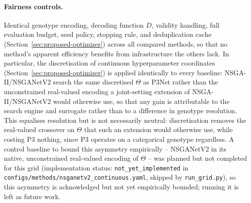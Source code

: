 \paragraph{Fairness controls.} Identical genotype encoding, decoding function $D$, validity handling,
full evaluation budget, seed policy, stopping rule, and deduplication cache (Section~\ref{sec:proposed-optimizer}) across all
compared methods, so that no method's apparent efficiency benefits from infrastructure the others lack. In
particular, the discretisation of continuous hyperparameter coordinates (Section~\ref{sec:proposed-optimizer}) is applied
identically to every baseline: NSGA-II/NSGANetV2 search the same discretised $\Theta$ as P3Net rather than
the unconstrained real-valued encoding a joint-setting extension of NSGA-II/NSGANetV2 would otherwise use,
so that any gain is attributable to the search engine and surrogate rather than to a difference in genotype
resolution. This equalises resolution but is not necessarily neutral: discretisation removes the real-valued
crossover on $\Theta$ that such an extension would otherwise use, while costing P3 nothing, since P3 operates
on a categorical genotype regardless. A control baseline to bound this asymmetry empirically -- NSGANetV2 in
its native, unconstrained real-valued encoding of $\Theta$ -- was planned but not completed for this grid
(implementation status: \texttt{not\_yet\_implemented} in \texttt{configs/methods/nsganetv2\_continuous.yaml},
skipped by \texttt{run\_grid.py}), so this asymmetry is acknowledged but not yet empirically bounded; running
it is left as future work.


